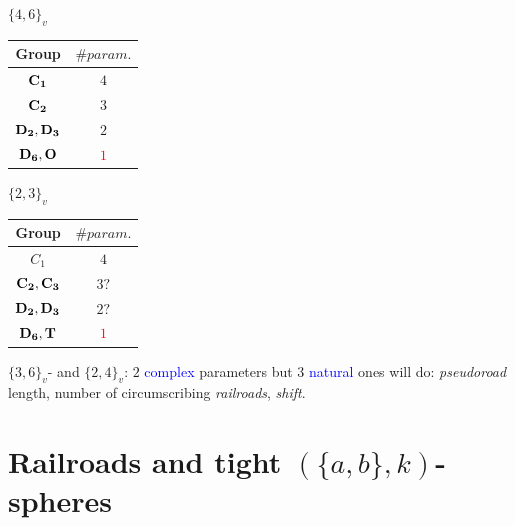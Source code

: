 \documentclass{beamer}
\begin{document}
\begin{frame}
{\begin{minipage}{4.5cm}
\centering  
$\{4,6\}_v$\par
\begin{tabular}{||c|c||}
\hline\hline
Group  & $\# param.$\\   
\hline\hline   
${\bf C_1}$  & $4$\\
${\bf C_2}$  & $3$\\
${\bf D_2,D_3}$  & $2$\\
${\bf D_6,O}$    & \textcolor{red}{$1$}\\
\hline\hline
\end{tabular}  
\end{minipage}
\begin{minipage}{4.5cm}
\centering 
$\{2,3\}_v$\par
\begin{tabular}{||c|c||}
\hline\hline   
Group  & $\# param.$\\  
\hline\hline  
{\bf $C_1$}  & $4$\\
${\bf C_2,C_3}$  & $3?$\\
${\bf D_2,D_3}$  & $2?$\\
${\bf D_6,T}$    & \textcolor{red}{$1$}\\
\hline\hline
\end{tabular} 
\end{minipage}
}

$\{3,6\}_v$- and $\{2,4\}_v$:  
$2$ \textcolor{blue}{complex} parameters but
$3$ \textcolor{blue}{natural} ones will do: {\em 
pseudoroad} length,  number of  
 circumscribing 
{\em railroads}, {\em shift}.
\end{frame}



\section[]{Railroads and tight $(\{a,b\},k)$-spheres}

\end{document}

